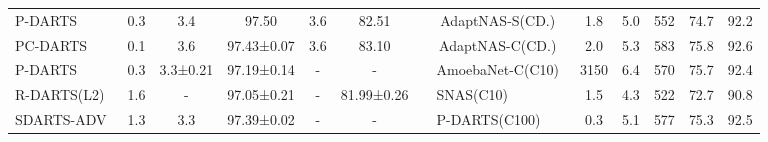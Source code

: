 \documentclass[10pt,twocolumn,letterpaper]{article}
\begin{document}
\begin{table*}[t]
\begin{center}
{\begin{tabular}{lcccccllccccc}
P-DARTS~\cite{pdarts}                 & 0.3                                                                   & 3.4          & 97.50         & 3.6           & 82.51         &  & \multicolumn{1}{c}{AdaptNAS-S(CD.)~\cite{adaptNAS}} & 1.8                                                                   & 5.0                                                                   & 552                                                                  & 74.7                                                                 & 92.2                                                                 \\
PC-DARTS~\cite{pc-darts}                & 0.1                                                                   & 3.6          & 97.43±0.07    & 3.6           & 83.10         &  & \multicolumn{1}{c}{AdaptNAS-C(CD.)~\cite{adaptNAS}} & 2.0                                                                   & 5.3                                                                   & 583                                                                  & 75.8                                                                 & 92.6                                                                 \\ \cline{1-6} \cline{8-13} 
P-DARTS~\cite{pdarts}                 & 0.3                                                                   & 3.3±0.21     & 97.19±0.14    & -             & -             &  & AmoebaNet-C(C10)~\cite{amoebanet}                    & 3150                                                                  & 6.4                                                                   & 570                                                                  & 75.7                                                                 & 92.4                                                                 \\
R-DARTS(L2)~\cite{rdarts}             & 1.6                                                                   & -            & 97.05±0.21    & -             & 81.99±0.26    &  & SNAS(C10)~\cite{snas}                           & 1.5                                                                   & 4.3                                                                   & 522                                                                  & 72.7                                                                 & 90.8                                                                 \\
SDARTS-ADV~\cite{sdarts}              & 1.3                                                                   & 3.3          & 97.39±0.02    & -             & -             &  & P-DARTS(C100)~\cite{pdarts}                       & 0.3                                                                   & 5.1                                                                   & 577                                                                  & 75.3                                                                 & 92.5                                                                 \\

\end{tabular}}
\end{center}
\end{table*}
\end{document}
